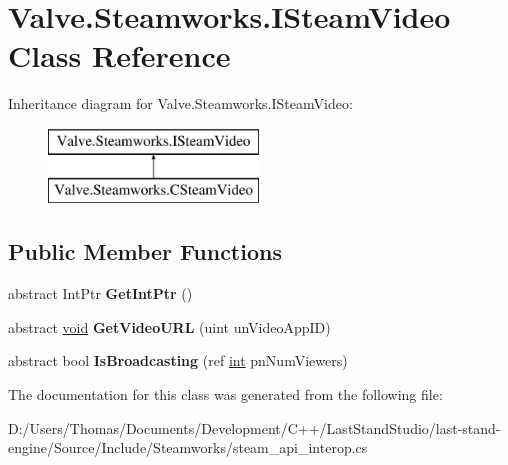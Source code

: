 \hypertarget{classValve_1_1Steamworks_1_1ISteamVideo}{}\section{Valve.\+Steamworks.\+I\+Steam\+Video Class Reference}
\label{classValve_1_1Steamworks_1_1ISteamVideo}
Inheritance diagram for Valve.\+Steamworks.\+I\+Steam\+Video\+:\begin{figure}[H]
\begin{center}
\leavevmode
\includegraphics[height=2.000000cm]{classValve_1_1Steamworks_1_1ISteamVideo}
\end{center}
\end{figure}
\subsection*{Public Member Functions}
\begin{DoxyCompactItemize}
\item 
\hypertarget{classValve_1_1Steamworks_1_1ISteamVideo_af6eb196b10aaf5f8460483861b18fd01}{}abstract Int\+Ptr {\bfseries Get\+Int\+Ptr} ()\label{classValve_1_1Steamworks_1_1ISteamVideo_af6eb196b10aaf5f8460483861b18fd01}

\item 
\hypertarget{classValve_1_1Steamworks_1_1ISteamVideo_a44b654ff9d6abca60ef55cb5022117e9}{}abstract \hyperlink{SDL__audio_8h_a52835ae37c4bb905b903cbaf5d04b05f}{void} {\bfseries Get\+Video\+U\+R\+L} (uint un\+Video\+App\+I\+D)\label{classValve_1_1Steamworks_1_1ISteamVideo_a44b654ff9d6abca60ef55cb5022117e9}

\item 
\hypertarget{classValve_1_1Steamworks_1_1ISteamVideo_a78f25ab7a179ccde37294aa7b14ddad1}{}abstract bool {\bfseries Is\+Broadcasting} (ref \hyperlink{SDL__thread_8h_a6a64f9be4433e4de6e2f2f548cf3c08e}{int} pn\+Num\+Viewers)\label{classValve_1_1Steamworks_1_1ISteamVideo_a78f25ab7a179ccde37294aa7b14ddad1}

\end{DoxyCompactItemize}


The documentation for this class was generated from the following file\+:\begin{DoxyCompactItemize}
\item 
D\+:/\+Users/\+Thomas/\+Documents/\+Development/\+C++/\+Last\+Stand\+Studio/last-\/stand-\/engine/\+Source/\+Include/\+Steamworks/steam\+\_\+api\+\_\+interop.\+cs\end{DoxyCompactItemize}
